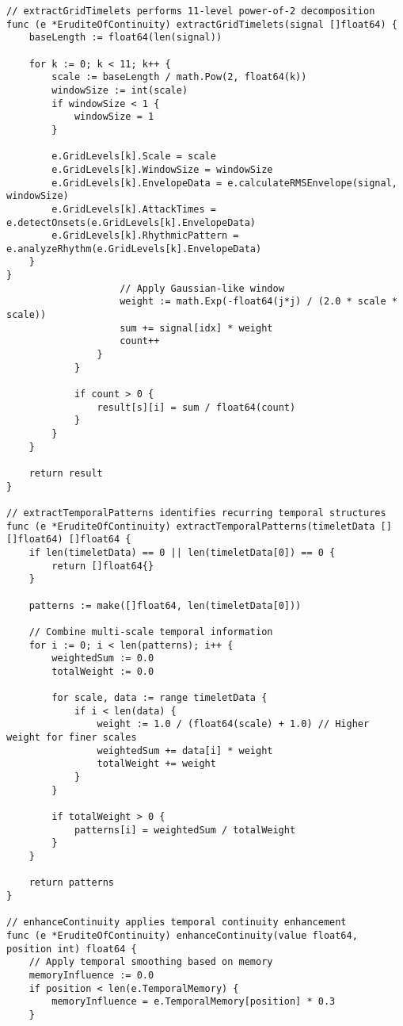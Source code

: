 \begin{tcolorbox}[colback=CodeBackground, colframe=DarkGray, title=Erudite of Continuity Implementation, fonttitle=\bfseries]
\begin{verbatim}
// extractGridTimelets performs 11-level power-of-2 decomposition
func (e *EruditeOfContinuity) extractGridTimelets(signal []float64) {
    baseLength := float64(len(signal))
    
    for k := 0; k < 11; k++ {
        scale := baseLength / math.Pow(2, float64(k))
        windowSize := int(scale)
        if windowSize < 1 {
            windowSize = 1
        }
        
        e.GridLevels[k].Scale = scale
        e.GridLevels[k].WindowSize = windowSize
        e.GridLevels[k].EnvelopeData = e.calculateRMSEnvelope(signal, windowSize)
        e.GridLevels[k].AttackTimes = e.detectOnsets(e.GridLevels[k].EnvelopeData)
        e.GridLevels[k].RhythmicPattern = e.analyzeRhythm(e.GridLevels[k].EnvelopeData)
    }
}
                    // Apply Gaussian-like window
                    weight := math.Exp(-float64(j*j) / (2.0 * scale * scale))
                    sum += signal[idx] * weight
                    count++
                }
            }
            
            if count > 0 {
                result[s][i] = sum / float64(count)
            }
        }
    }
    
    return result
}

// extractTemporalPatterns identifies recurring temporal structures
func (e *EruditeOfContinuity) extractTemporalPatterns(timeletData [][]float64) []float64 {
    if len(timeletData) == 0 || len(timeletData[0]) == 0 {
        return []float64{}
    }
    
    patterns := make([]float64, len(timeletData[0]))
    
    // Combine multi-scale temporal information
    for i := 0; i < len(patterns); i++ {
        weightedSum := 0.0
        totalWeight := 0.0
        
        for scale, data := range timeletData {
            if i < len(data) {
                weight := 1.0 / (float64(scale) + 1.0) // Higher weight for finer scales
                weightedSum += data[i] * weight
                totalWeight += weight
            }
        }
        
        if totalWeight > 0 {
            patterns[i] = weightedSum / totalWeight
        }
    }
    
    return patterns
}

// enhanceContinuity applies temporal continuity enhancement
func (e *EruditeOfContinuity) enhanceContinuity(value float64, position int) float64 {
    // Apply temporal smoothing based on memory
    memoryInfluence := 0.0
    if position < len(e.TemporalMemory) {
        memoryInfluence = e.TemporalMemory[position] * 0.3
    }
    

\end{verbatim}
\end{tcolorbox}
